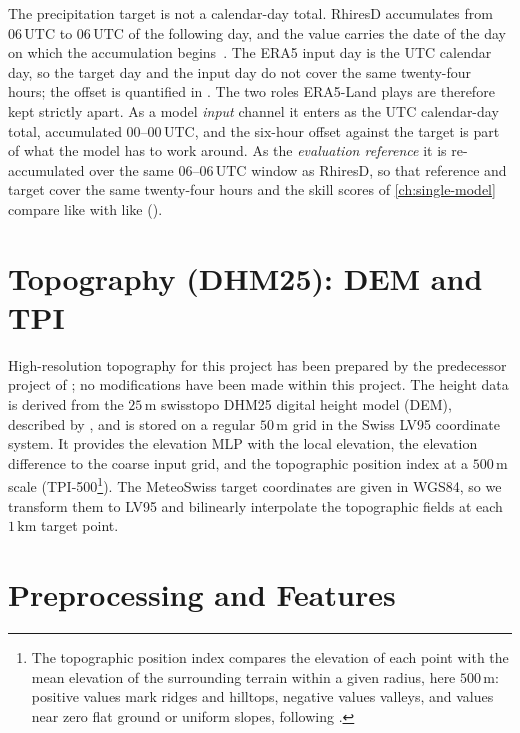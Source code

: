 The precipitation target is not a calendar-day total. RhiresD accumulates from $06\,\mathrm{UTC}$ to $06\,\mathrm{UTC}$ of the following day, and the value carries the date of the day on which the accumulation begins~\cite{meteoswiss_rhiresd_doc}. The ERA5 input day is the UTC calendar day, so the target day and the input day do not cover the same twenty-four hours; the offset is quantified in . The two roles ERA5-Land plays are therefore kept strictly apart. As a model \emph{input} channel it enters as the UTC calendar-day total, accumulated $00$--$00\,\mathrm{UTC}$, and the six-hour offset against the target is part of what the model has to work around. As the \emph{evaluation reference} it is re-accumulated over the same $06$--$06\,\mathrm{UTC}$ window as RhiresD, so that reference and target cover the same twenty-four hours and the skill scores of \cref{ch:single-model} compare like with like ().

\section{Topography (DHM25): DEM and TPI}\label{sec:data-topography}

High-resolution topography for this project has been prepared by the predecessor project of \textcite{passos}; no modifications have been made within this project. The height data is derived from the $25\,\mathrm{m}$ swisstopo DHM25 digital height model (DEM), described by \textcite{swisstopo_dhm25}, and is stored on a regular $50\,\mathrm{m}$ grid in the Swiss LV95 coordinate system. It provides the elevation MLP with the local elevation, the elevation difference to the coarse input grid, and the topographic position index at a $500\,\mathrm{m}$ scale (TPI-500\footnote{The topographic position index compares the elevation of each point with the mean elevation of the surrounding terrain within a given radius, here $500\,\mathrm{m}$: positive values mark ridges and hilltops, negative values valleys, and values near zero flat ground or uniform slopes, following \textcite{weiss2001tpi}.}). The MeteoSwiss target coordinates are given in WGS84, so we transform them to LV95 and bilinearly interpolate the topographic fields at each $1\,\mathrm{km}$ target point.

\section{Preprocessing and Features}\label{sec:data-preprocessing}

